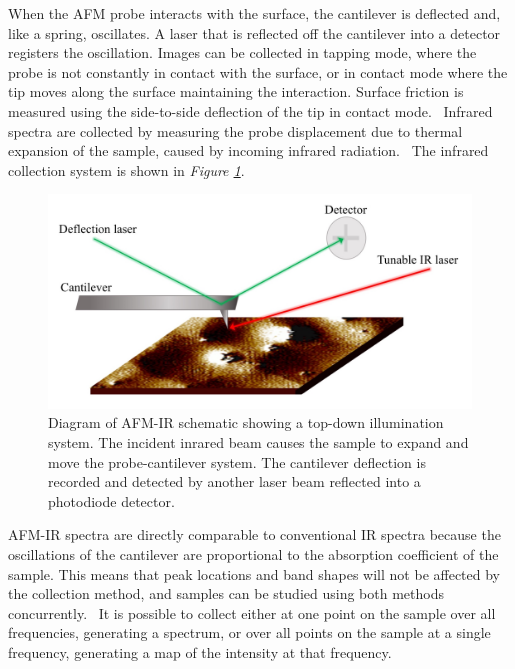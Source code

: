 When the AFM probe interacts with the surface, the cantilever is deflected and, like a spring, oscillates. A laser that is reflected off the cantilever into a detector registers the oscillation. Images can be collected in tapping mode, where the probe is not constantly in contact with the surface, or in contact mode where the tip moves along the surface maintaining the interaction. Surface friction is measured using the side-to-side deflection of the tip in contact mode.~\autocite{friction_afm} Infrared spectra are collected by measuring the probe displacement due to thermal expansion of the sample, caused by incoming infrared radiation.~\autocite{dazzi2017,kurouski} The infrared collection system is shown in \textit{Figure \ref{fig:afm_diagram}}.


\begin{figure}[H]
\centering
  \includegraphics[width=\linewidth]{afm_diagram}
\caption[Diagram of AFM-IR schematic showing a top-down illumination system.]{Diagram of AFM-IR schematic showing a top-down illumination system. The incident inrared beam causes the sample to expand and move the probe-cantilever system. The cantilever deflection is recorded and detected by another laser beam reflected into a photodiode detector.~\autocite{Morsch,dazzi2017}}
\label{fig:afm_diagram}
\end{figure}

AFM-IR spectra are directly comparable to conventional IR spectra because the oscillations of the cantilever are proportional to the absorption coefficient of the sample. This means that peak locations and band shapes will not be affected by the collection method, and samples can be studied using both methods concurrently.~\autocite{dazzi2017,kurouski} It is possible to collect either at one point on the sample over all frequencies, generating a spectrum, or over all points on the sample at a single frequency, generating a map of the intensity at that frequency. 


